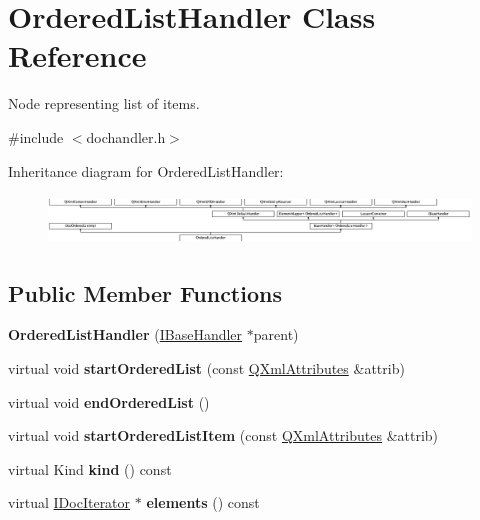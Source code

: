 \hypertarget{class_ordered_list_handler}{}\section{Ordered\+List\+Handler Class Reference}
\label{class_ordered_list_handler}


Node representing list of items.  




{\ttfamily \#include $<$dochandler.\+h$>$}

Inheritance diagram for Ordered\+List\+Handler\+:\begin{figure}[H]
\begin{center}
\leavevmode
\includegraphics[height=1.311475cm]{class_ordered_list_handler}
\end{center}
\end{figure}
\subsection*{Public Member Functions}
\begin{DoxyCompactItemize}
\item 
\mbox{\label{class_ordered_list_handler_aa76fb23b22ea41a460a6e68a3fe62fd5}} 
{\bfseries Ordered\+List\+Handler} (\mbox{\hyperlink{class_i_base_handler}{I\+Base\+Handler}} $\ast$parent)
\item 
\mbox{\label{class_ordered_list_handler_a735a356c52a8c0338cc709bce5368ba1}} 
virtual void {\bfseries start\+Ordered\+List} (const \mbox{\hyperlink{class_q_xml_attributes}{Q\+Xml\+Attributes}} \&attrib)
\item 
\mbox{\label{class_ordered_list_handler_a1cf37222d852f312a05425a241dbbd7f}} 
virtual void {\bfseries end\+Ordered\+List} ()
\item 
\mbox{\label{class_ordered_list_handler_afebcceb1d60b0dab32c53775f9cbfb75}} 
virtual void {\bfseries start\+Ordered\+List\+Item} (const \mbox{\hyperlink{class_q_xml_attributes}{Q\+Xml\+Attributes}} \&attrib)
\item 
\mbox{\label{class_ordered_list_handler_af2469700e48e3b393dde7bcead7b3f68}} 
virtual Kind {\bfseries kind} () const
\item 
\mbox{\label{class_ordered_list_handler_aa2782148ce52126eeb4e020a282eaa19}} 
virtual \mbox{\hyperlink{class_i_doc_iterator}{I\+Doc\+Iterator}} $\ast$ {\bfseries elements} () const
\end{DoxyCompactItemize}
